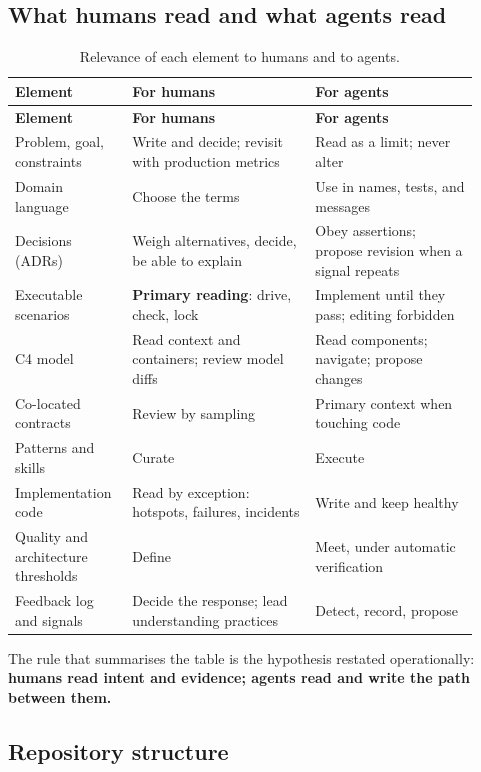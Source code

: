 \documentclass[11pt]{article}
\begin{document}
\subsection{What humans read and what agents read}

\small
\begin{longtable}{p{0.22\linewidth}p{0.37\linewidth}p{0.33\linewidth}}
\caption{Relevance of each element to humans and to agents.}\\
\toprule
\textbf{Element} & \textbf{For humans} & \textbf{For agents} \\
\midrule
\endfirsthead
\toprule
\textbf{Element} & \textbf{For humans} & \textbf{For agents} \\
\midrule
\endhead
Problem, goal, constraints & Write and decide; revisit with production metrics & Read as a limit; never alter \\
Domain language & Choose the terms & Use in names, tests, and messages \\
Decisions (ADRs) & Weigh alternatives, decide, be able to explain & Obey assertions; propose revision when a signal repeats \\
Executable scenarios & \textbf{Primary reading}: drive, check, lock & Implement until they pass; editing forbidden \\
C4 model & Read context and containers; review model diffs & Read components; navigate; propose changes \\
Co-located contracts & Review by sampling & Primary context when touching code \\
Patterns and skills & Curate & Execute \\
Implementation code & Read by exception: hotspots, failures, incidents & Write and keep healthy \\
Quality and architecture thresholds & Define & Meet, under automatic verification \\
Feedback log and signals & Decide the response; lead understanding practices & Detect, record, propose \\
\bottomrule
\end{longtable}
\normalsize

The rule that summarises the table is the hypothesis restated operationally: \textbf{humans read intent and evidence; agents read and write the path between them.}

\subsection{Repository structure}
\end{document}
